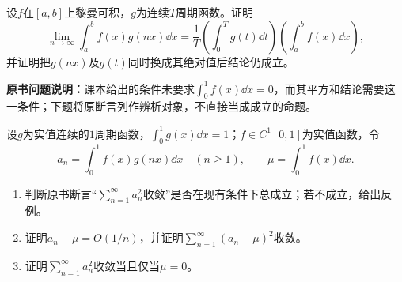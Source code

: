 设$f$在$[a,b]$上黎曼可积，$g$为连续$T$周期函数。证明
\[
 \lim_{n\to\infty}\int_a^bf(x)g(nx)\dd x
 =\frac1T\left(\int_0^Tg(t)\dd t\right)\left(\int_a^bf(x)\dd x\right),
\]
并证明把$g(nx)$及$g(t)$同时换成其绝对值后结论仍成立。


\noindent\textbf{原书问题说明：}课本给出的条件未要求$\int_0^1 f(x)\dd x=0$，而其平方和结论需要这一条件；下题将原断言列作辨析对象，不直接当成成立的命题。

设$g$为实值连续的$1$周期函数，$\int_0^1g(x)\dd x=1$；$f\in C^1[0,1]$为实值函数，令
\[
 a_n=\int_0^1 f(x)g(nx)\dd x\quad(n\ge1),
 \qquad \mu=\int_0^1f(x)\dd x.
\]
\begin{enumerate}[label=(\arabic*)]
\item 判断原书断言“$\sum_{n=1}^{\infty}a_n^2$收敛”是否在现有条件下总成立；若不成立，给出反例。
\item 证明$a_n-\mu=O(1/n)$，并证明$\sum_{n=1}^{\infty}(a_n-\mu)^2$收敛。
\item 证明$\sum_{n=1}^{\infty}a_n^2$收敛当且仅当$\mu=0$。
\end{enumerate}


